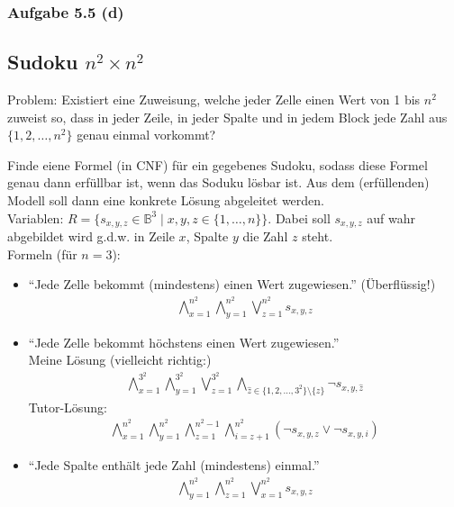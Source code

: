\subsubsection{Aufgabe 5.5 (d)}

\subsection{Sudoku $n^2\times n^2$}
Problem: Existiert eine Zuweisung, welche jeder Zelle einen Wert von 1 bis $n^2$ zuweist so, dass in jeder Zeile, in jeder  Spalte und in jedem Block jede Zahl aus $\lbrace1,2,\ldots,n^2\rbrace$ genau einmal vorkommt?

\begin{aufgabe}
	Finde eiene Formel (in CNF) für ein gegebenes Sudoku, sodass diese Formel genau dann erfüllbar ist, wenn das Soduku lösbar ist. 
	Aus dem (erfüllenden) Modell soll dann eine konkrete Lösung abgeleitet werden.\\
	Variablen: $R=\big\lbrace s_{x,y,z}\in\mathbb{B}^3\mid x,y,z\in\lbrace 1,\ldots,n\rbrace\big\rbrace$.
	Dabei soll $s_{x,y,z}$ auf wahr abgebildet wird g.d.w. in Zeile $x$, Spalte $y$ die Zahl $z$ steht.\\
	Formeln (für $n=3$):
	\begin{itemize}
		\item ``Jede Zelle bekommt (mindestens) einen Wert zugewiesen.'' (Überflüssig!)
		\begin{align*}
			\bigwedge\limits_{x=1}^{n^2}\bigwedge\limits_{y=1}^{n^2}\bigvee\limits_{z=1}^{n^2} s_{x,y,z}
		\end{align*}
		\item ``Jede Zelle bekommt höchstens einen Wert zugewiesen.''\\
		Meine Lösung (vielleicht richtig:)
		\begin{align*}
			\bigwedge\limits_{x=1}^{3^2}\bigwedge\limits_{y=1}^{3^2}\bigvee\limits_{z=1}^{3^2}\bigwedge\limits_{\hat{z}\in\lbrace1,2,\ldots,3^2\rbrace\setminus\lbrace z\rbrace} \neg s_{x,y,\hat{z}}
		\end{align*}
		Tutor-Lösung:
		\begin{align*}
			\bigwedge\limits_{x=1}^{n^2}
			\bigwedge\limits_{y=1}^{n^2}
			\bigwedge\limits_{z=1}^{n^2-1}
			\bigwedge\limits_{i=z+1}^{n^2}
			(\neg s_{x,y,z}\vee\neg s_{x,y,i})
		\end{align*}
		\item ``Jede Spalte enthält jede Zahl (mindestens) einmal.''
		\begin{align*}
			\bigwedge\limits_{y=1}^{n^2}\bigwedge\limits_{z=1}^{n^2}\bigvee\limits_{x=1}^{n^2} s_{x,y,z}

\end{align*}
\end{itemize}
\end{aufgabe}

